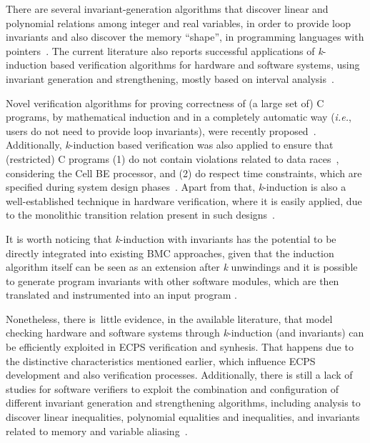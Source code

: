 \documentclass{cta-author}
\begin{document}
There are several invariant-generation algorithms that discover linear and polynomial relations among integer and real variables, in order to provide loop invariants and also discover the memory ``shape'', in programming languages with pointers~\cite{pips:2013,Henry:2012}. The current literature also reports successful applications of \textit{k}-induction based verification algorithms for hardware and software systems, using invariant generation and strengthening, mostly based on interval analysis~\cite{Beyer15}. 

Novel verification algorithms for proving correctness of (a large set of) C programs, by mathematical induction and in a completely automatic way ({\it i.e.}, users do not need to provide loop invariants), were recently proposed~\cite{Gadelha15,Beyer15,Brain15,Kinductor,Rocha17}. Additionally, \textit{k}-induction based verification was also applied to ensure that (restricted) C programs (1) do not contain violations related to data races~\cite{Donaldson10}, considering the Cell BE processor, and (2) do respect time constraints, which are specified during system design phases~\cite{EenS03}. Apart from that, \textit{k}-induction is also a well-established technique in hardware verification, where it is easily applied, due to the monolithic transition relation present in such designs~\cite{EenS03,Sheera00,GrosseLD09}.

It is worth noticing that \textit{k}-induction with invariants has the potential to be directly integrated into existing BMC approaches, given that the induction algorithm itself can be seen as an extension after \textit{k} unwindings and it is possible to generate program invariants with other software modules, which are then translated and instrumented into an input program \cite{Rocha17}.

Nonetheless, there is~little evidence, in the available literature, that model checking hardware and software systems through \textit{k}-induction (and invariants) can be efficiently exploited in ECPS verification and synhesis. That happens due to the distinctive characteristics mentioned earlier, which influence ECPS development and also verification processes. Additionally, there is still a lack of studies for software verifiers to exploit the combination and configuration of different invariant generation and strengthening algorithms, including analysis to discover linear inequalities, polynomial equalities and inequalities, and invariants related to memory and variable aliasing~\cite{Bradley07}.
\end{document}
